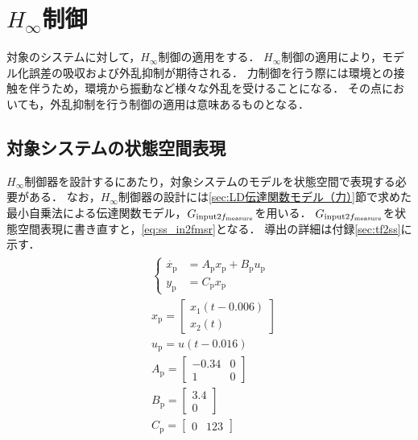 \section{$H_\infty$制御}
対象のシステムに対して，$H_\infty$制御の適用をする．
$H_\infty$制御の適用により，モデル化誤差の吸収および外乱抑制が期待される\cite{三平満司1997実用的な,平田201703}．
力制御を行う際には環境との接触を伴うため，環境から振動など様々な外乱を受けることになる．
その点においても，外乱抑制を行う制御の適用は意味あるものとなる．
\subsection{対象システムの状態空間表現}
$H_\infty$制御器を設計するにあたり，対象システムのモデルを状態空間で表現する必要がある．
なお，$H_\infty$制御器の設計には\ref{sec:LD伝達関数モデル（力）}節で求めた最小自乗法による伝達関数モデル，$G_{\mathrm{input}2f_\mathrm{measure}}$を用いる．
$G_{\mathrm{input}2f_\mathrm{measure}}$を状態空間表現に書き直すと，\eqnname\eqref{eq:ss_in2fmsr}となる．
導出の詳細は付録\ref{sec:tf2ss}に示す．
\begin{align}
    \label{eq:ss_in2fmsr}
    \begin{split}
        &\begin{cases}
            \dot{x_\mathrm{p}}
            &=A_\mathrm{p}x_\mathrm{p}
            +B_\mathrm{p}
            u_\mathrm{p} \\[10pt]
            y_\mathrm{p} &=
            C_\mathrm{p}x_\mathrm{p}
        \end{cases}\\[10pt]
        &x_\mathrm{p} = 
        \begin{bmatrix}
            x_1(t-0.006)\\
            x_2(t)
        \end{bmatrix}\\
        &u_\mathrm{p} = u(t-0.016)\\
        &A_\mathrm{p} = 
        \begin{bmatrix}
            -0.34 & 0\\
            1 & 0
        \end{bmatrix}\\
        &B_\mathrm{p} = 		
        \begin{bmatrix}
            3.4\\
            0
        \end{bmatrix}\\
        &C_\mathrm{p} = 
        \begin{bmatrix}	
            0 & 123
        \end{bmatrix}
    \end{split}
\end{align}

